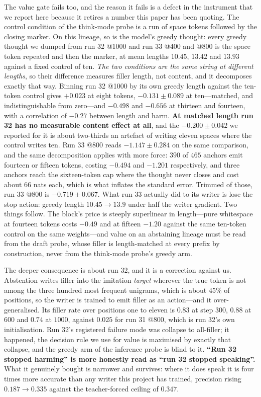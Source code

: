 \documentclass{article} %
\begin{document}
The value gate fails too, and the reason it fails is a defect in the instrument that we
report here because it retires a number this paper has been quoting. The control condition of
the think-mode probe is a run of space tokens followed by the closing marker. On this lineage,
so is the model's greedy thought: every greedy thought we dumped from run 32 @1000 and run 33
@400 and @800 is the space token repeated and then the marker, at mean lengths $10.45$,
$13.42$ and $13.93$ against a fixed control of ten. \emph{The two conditions are the same
string at different lengths}, so their difference measures filler length, not content, and it
decomposes exactly that way. Binning run 32 @1000 by its own greedy length against the
ten-token control gives $+0.023$ at eight tokens, $-0.131 \pm 0.089$ at ten---matched, and
indistinguishable from zero---and $-0.498$ and $-0.656$ at thirteen and fourteen, with a
correlation of $-0.27$ between length and harm. \textbf{At matched length run 32 has no
measurable content effect at all}, and the $-0.200 \pm 0.042$ we reported for it is about
two-thirds an artefact of writing eleven spaces where the control writes ten. Run 33 @800
reads $-1.147 \pm 0.284$ on the same comparison, and the same decomposition applies with more
force: $390$ of $465$ anchors emit fourteen or fifteen tokens, costing $-0.494$ and $-1.201$
respectively, and three anchors reach the sixteen-token cap where the thought never closes
and cost about $66$ nats each, which is what inflates the standard error. Trimmed of those,
run 33 @800 is $-0.719 \pm 0.067$. What run 33 actually did to its writer is lose the stop
action: greedy length $10.45 \to 13.9$ under half the writer gradient. Two things follow. The
block's price is steeply superlinear in length---pure whitespace at fourteen tokens costs
$-0.49$ and at fifteen $-1.20$ against the same ten-token control on the same weights---and
value on an abstaining lineage must be read from the draft probe, whose filler is
length-matched at every prefix by construction, never from the think-mode probe's greedy arm.

The deeper consequence is about run 32, and it is a correction against us. Abstention writes
filler into the imitation \emph{target} wherever the true token is not among the three hundred
most frequent unigrams, which is about $45\%$ of positions, so the writer is trained to emit
filler as an action---and it over-generalised. Its filler rate over positions one to eleven is
$0.83$ at step $300$, $0.88$ at $600$ and $0.74$ at $1000$, against $0.025$ for run 31 @800,
which is run 32's own initialisation. Run 32's registered failure mode was collapse to
all-filler; it happened, the decision rule we use for value is maximised by exactly that
collapse, and the greedy arm of the inference probe is blind to it. \textbf{``Run 32 stopped
harming'' is more honestly read as ``run 32 stopped speaking''.} What it genuinely bought is
narrower and survives: where it does speak it is four times more accurate than any writer this
project has trained, precision rising $0.187 \to 0.335$ against the teacher-forced ceiling of
$0.347$.
\end{document}
